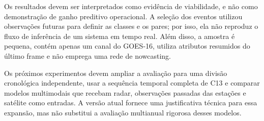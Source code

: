 Os resultados devem ser interpretados como evidência de viabilidade, e não como demonstração de ganho preditivo operacional. A seleção dos eventos utilizou observações futuras para definir as classes e os pares; por isso, ela não reproduz o fluxo de inferência de um sistema em tempo real. Além disso, a amostra é pequena, contém apenas um canal do GOES-16, utiliza atributos resumidos do último frame e não emprega uma rede de nowcasting.

Os próximos experimentos devem ampliar a avaliação para uma divisão cronológica independente, usar a sequência temporal completa de C13 e comparar modelos multimodais que recebam radar, observações passadas das estações e satélite como entradas. A versão atual fornece uma justificativa técnica para essa expansão, mas não substitui a avaliação multianual rigorosa desses modelos.
